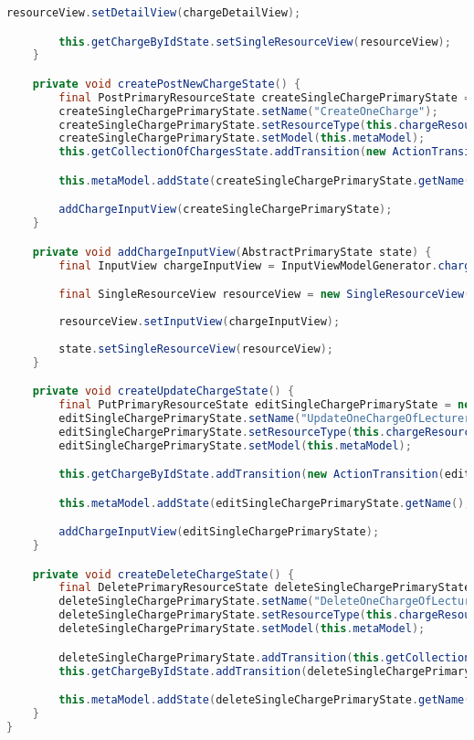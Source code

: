 \begin{lstlisting}[label=lst:enfield_model,
language=java,
firstnumber=1,
caption=Beschreibung des \textit{Enfield-Modell} der Referenzimplementierung. ]
		resourceView.setDetailView(chargeDetailView);

		this.getChargeByIdState.setSingleResourceView(resourceView);
	}

	private void createPostNewChargeState() {
		final PostPrimaryResourceState createSingleChargePrimaryState = new PostPrimaryResourceState();
		createSingleChargePrimaryState.setName("CreateOneCharge");
		createSingleChargePrimaryState.setResourceType(this.chargeResource);
		createSingleChargePrimaryState.setModel(this.metaModel);
		this.getCollectionOfChargesState.addTransition(new ActionTransition(createSingleChargePrimaryState, "createChargeOfLecturer"));

		this.metaModel.addState(createSingleChargePrimaryState.getName(), createSingleChargePrimaryState);

		addChargeInputView(createSingleChargePrimaryState);
	}

	private void addChargeInputView(AbstractPrimaryState state) {
		final InputView chargeInputView = InputViewModelGenerator.charge();

		final SingleResourceView resourceView = new SingleResourceView();
	
		resourceView.setInputView(chargeInputView);
	
		state.setSingleResourceView(resourceView);
	}

	private void createUpdateChargeState() {
		final PutPrimaryResourceState editSingleChargePrimaryState = new PutPrimaryResourceState();
		editSingleChargePrimaryState.setName("UpdateOneChargeOfLecturer");
		editSingleChargePrimaryState.setResourceType(this.chargeResource);
		editSingleChargePrimaryState.setModel(this.metaModel);

		this.getChargeByIdState.addTransition(new ActionTransition(editSingleChargePrimaryState, "updateCharge"));

		this.metaModel.addState(editSingleChargePrimaryState.getName(), editSingleChargePrimaryState);

		addChargeInputView(editSingleChargePrimaryState);
	}

	private void createDeleteChargeState() {
		final DeletePrimaryResourceState deleteSingleChargePrimaryState = new DeletePrimaryResourceState();
		deleteSingleChargePrimaryState.setName("DeleteOneChargeOfLecturer");
		deleteSingleChargePrimaryState.setResourceType(this.chargeResource);
		deleteSingleChargePrimaryState.setModel(this.metaModel);

		deleteSingleChargePrimaryState.addTransition(this.getCollectionOfChargesState, "getAllCharges");
		this.getChargeByIdState.addTransition(deleteSingleChargePrimaryState, "deleteCharge");

		this.metaModel.addState(deleteSingleChargePrimaryState.getName(), deleteSingleChargePrimaryState);
	}
}
\end{lstlisting}


